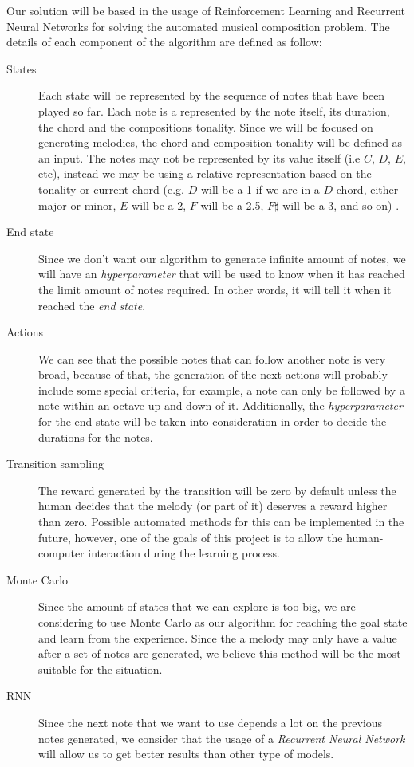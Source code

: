 Our solution will be based in the usage of Reinforcement Learning and Recurrent Neural Networks for solving the automated musical composition problem. The details of each component of the algorithm are defined as follow:

\begin{description}
  \item [States] Each state will be represented by the sequence of notes that have been played so far. Each note is a represented by the note itself, its duration, the chord and the compositions tonality. Since we will be focused on generating melodies, the chord and composition tonality will be defined as an input. The notes may not be represented by its value itself (i.e $ C $, $D$, $E$, etc), instead we may be using a relative representation based on the tonality or current chord (e.g. $ D $ will be a 1 if we are in a $ D $ chord, either major or minor, $ E $ will be a 2, $ F $ will be a 2.5, $ F\sharp $ will be a 3, and so on) \cite{vilchez2015genetic}.
  \item [End state] Since we don't want our algorithm to generate infinite amount of notes, we will have an \emph{hyperparameter} that will be used to know when it has reached the limit amount of notes required. In other words, it will tell it when it reached the \emph{end state}.
  \item [Actions] We can see that the possible notes that can follow another note is very broad, because of that, the generation of the next actions will probably include some special criteria, for example, a note can only be followed by a note within an octave up and down of it. Additionally, the \emph{hyperparameter} for the end state will be taken into consideration in order to decide the durations for the notes.
  \item [Transition sampling] The reward generated by the transition will be zero by default unless the human decides that the melody (or part of it) deserves a reward higher than zero. Possible automated methods for this can be implemented in the future, however, one of the goals of this project is to allow the human-computer interaction during the learning process.
  \item [Monte Carlo] Since the amount of states that we can explore is too big, we are considering to use Monte Carlo as our algorithm for reaching the goal state and learn from the experience. Since the a melody may only have a value after a set of notes are generated, we believe this method will be the most suitable for the situation.
  \item [RNN] Since the next note that we want to use depends a lot on the previous notes generated, we consider that the usage of a \emph{Recurrent Neural Network} will allow us to get better results than other type of models.
\end{description}

